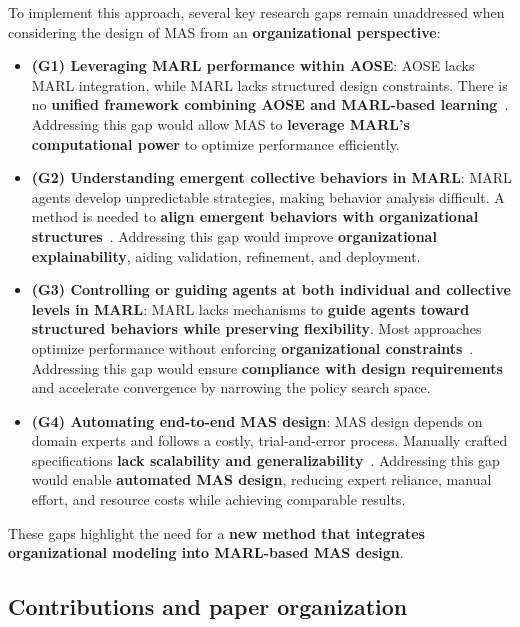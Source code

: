 \documentclass[pdflatex,sn-mathphys-num]{sn-jnl}%
\theoremstyle{thmstyleone}%
\theoremstyle{thmstyletwo}%
\theoremstyle{thmstylethree}%
\begin{document}
To implement this approach, several key research gaps remain unaddressed when considering the design of MAS from an \textbf{organizational perspective}:
%
\begin{itemize}
  \item \textbf{(G1) Leveraging MARL performance within AOSE}: AOSE lacks MARL integration, while MARL lacks structured design constraints. There is no \textbf{unified framework combining AOSE and MARL-based learning}~\cite{Cossentino2014}. Addressing this gap would allow MAS to \textbf{leverage MARL's computational power} to optimize performance efficiently.
  
  \item \textbf{(G2) Understanding emergent collective behaviors in MARL}: MARL agents develop unpredictable strategies, making behavior analysis difficult. A method is needed to \textbf{align emergent behaviors with organizational structures}~\cite{Du2022, Papoudakis2021}. Addressing this gap would improve \textbf{organizational explainability}, aiding validation, refinement, and deployment.
  
  \item \textbf{(G3) Controlling or guiding agents at both individual and collective levels in MARL}: MARL lacks mechanisms to \textbf{guide agents toward structured behaviors while preserving flexibility}. Most approaches optimize performance without enforcing \textbf{organizational constraints}~\cite{Oroojlooy2023}. Addressing this gap would ensure \textbf{compliance with design requirements} and accelerate convergence by narrowing the policy search space.
  
  \item \textbf{(G4) Automating end-to-end MAS design}: MAS design depends on domain experts and follows a costly, trial-and-error process. Manually crafted specifications \textbf{lack scalability and generalizability}~\cite{Nguyen2020}. Addressing this gap would enable \textbf{automated MAS design}, reducing expert reliance, manual effort, and resource costs while achieving comparable results.
\end{itemize}
%
These gaps highlight the need for a \textbf{new method that integrates organizational modeling into MARL-based MAS design}.


\subsection{Contributions and paper organization}
\end{document}

